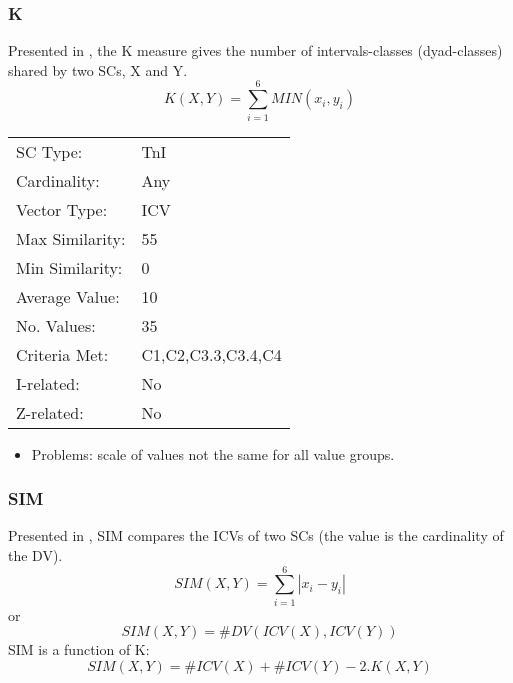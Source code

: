 \documentclass{article}
\begin{document}
\subsubsection{K}
\label{sec-12-1-1}

Presented in \citet[pp. 448]{Morris1979}, the K measure gives the
number of intervals-classes (dyad-classes) shared by two SCs, X and Y.
$$ K(X,Y)= \sum_{i=1}^{6}{MIN(x_{i},y_{i})} $$

\begin{center}
\begin{tabular}{ll}
 SC Type:         &  TnI                 \\
 Cardinality:     &  Any                 \\
 Vector Type:     &  ICV                 \\
 Max Similarity:  &  55                  \\
 Min Similarity:  &  0                   \\
 Average Value:   &  10                  \\
 No. Values:      &  35                  \\
 Criteria Met:    &  C1,C2,C3.3,C3.4,C4  \\
 I-related:       &  No                  \\
 Z-related:       &  No                  \\
\end{tabular}
\end{center}


\begin{itemize}
\item Problems: scale of values not the same for all value groups.
\end{itemize}
\subsubsection{SIM}
\label{sec-12-1-2}

Presented in \citet[pp. 446]{Morris1979}, SIM compares the ICVs of
two SCs (the value is the cardinality of the DV).
$$SIM\left(X,Y\right)=\sum_{i=1}^{6}\left|x_{i}-y_{i}\right|$$
or
$$SIM\left(X,Y\right)=\#DV\left(ICV\left(X\right),ICV\left(Y\right)\right)$$
SIM is a function of K:
$$SIM(X,Y) = \#ICV(X) + \#ICV(Y) - 2.K(X,Y)$$
\end{document}
